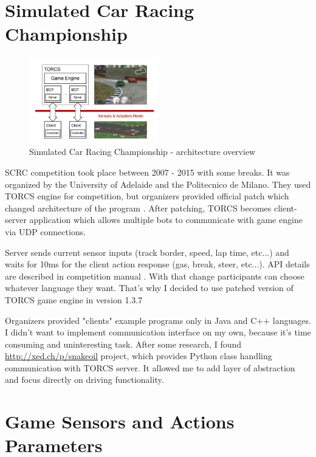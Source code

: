 \documentclass[declaration,shortabstract,english,inz]{iithesis}
\begin{document}
\section{Simulated Car Racing Championship}

\begin{figure}
    \includegraphics[width=0.5\textwidth]{img/scr_architecture.png}
    \caption{Simulated Car Racing Championship - architecture overview \cite{scrc_manual}}
    \label{fig:scrc_arc}
\end{figure}

SCRC competition took place between 2007 - 2015 with some breaks. It was organized by the University of Adelaide and the Politecnico de Milano.
They used TORCS engine for competition, but organizers provided official patch which changed architecture of the program \cite{SCRC}.
After patching, TORCS becomes client-server application which allows multiple bots to communicate with game engine via UDP connections. 


Server sends current sensor inputs (track border, speed, lap time, etc...) and waits for 10ms for the client action response (gas, break, steer, etc...).
API details are described in competition manual \cite{scrc_manual}.
With that change participants can choose whatever language they want.
That's why I decided to use patched version of TORCS game engine in version 1.3.7

Organizers provided "clients" example programs only in Java and C++ languages.
I didn't want to implement communication interface on my own, because it's time consuming  and uninteresting task.
After some research, I found \url{http://xed.ch/p/snakeoil} project, which provides Python class handling communication with TORCS server.
It allowed me to add layer of abstraction and focus directly on driving functionality.

\section{Game Sensors and Actions Parameters}
    
\end{document}

